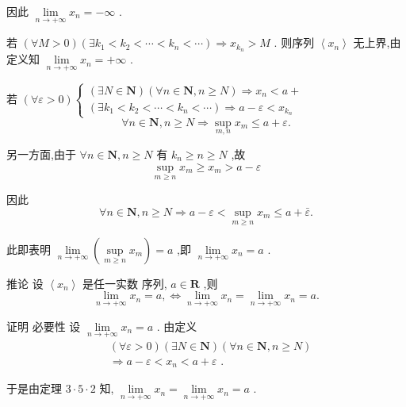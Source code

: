 因此 $\mathop{\lim }\limits_{{n \rightarrow   + \infty }}{x}_{n} =  - \infty$ .

若 $\left( {\forall M > 0}\right) \left( {\exists {k}_{1} < {k}_{2} < \cdots  < {k}_{n} < \cdots }\right)  \Rightarrow  {x}_{{k}_{n}} > M$ . 则序列 $\left\langle  {x}_{n}\right\rangle$ 无上界,由定义知 $\mathop{\lim }\limits_{{n \rightarrow   + \infty }}{x}_{n} =  + \infty$ .

若 $\left( {\forall \varepsilon  > 0}\right) \left\{  \begin{array}{l} \left( {\exists N \in  \mathbf{N}}\right) \left( {\forall n \in  \mathbf{N},n \geq  N}\right)  \Rightarrow  {x}_{n} < a + \\  \left( {\exists {k}_{1} < {k}_{2} < \cdots  < {k}_{n} < \cdots }\right)  \Rightarrow  a - \varepsilon  < {x}_{{k}_{n}} \end{array}\right.$
$$\forall n \in  \mathbf{N},n \geq  N \Rightarrow  \mathop{\sup }\limits_{{m,n}}{x}_{m} \leq  a + \varepsilon .$$

另一方面,由于 $\forall n \in  \mathbf{N},n \geq  N$ 有 ${k}_{n} \geq  n \geq  N$ ,故
$$\mathop{\sup }\limits_{{m \geq  n}}{x}_{m} \geq  {x}_{m} > a - \varepsilon$$

因此
$$\forall n \in  \mathbf{N},n \geq  N \Rightarrow  a - \varepsilon  < \mathop{\sup }\limits_{{m \geq  n}}{x}_{m} \leq  a + \bar{\varepsilon }.$$

此即表明 $\mathop{\lim }\limits_{{n \rightarrow   + \infty }}\left( {\mathop{\sup }\limits_{{m \geq  n}}{x}_{m}}\right)  = a$ ,即 $\mathop{\lim }\limits_{{n \rightarrow   + \infty }}{x}_{n} = a$ .

推论 设 $\left\langle  {x}_{n}\right\rangle$ 是任一实数 序列, $a \in  \mathbf{R}$ ,则
$$\mathop{\lim }\limits_{{n \rightarrow   + \infty }}{x}_{n} = a, \Leftrightarrow  \mathop{\lim }\limits_{{n \rightarrow   + \infty }}{x}_{n} = \mathop{\lim }\limits_{{n \rightarrow   + \infty }}{x}_{n} = a.$$

证明 必要性 设 $\mathop{\lim }\limits_{{n \rightarrow   + \infty }}{x}_{n} = a$ . 由定义
\begin{align*}
	&\left( {\forall \varepsilon  > 0}\right) \left( {\exists N \in  \mathbf{N}}\right) \left( {\forall n \in  \mathbf{N},n \geq  N}\right)\\
	&\Rightarrow  a - \varepsilon  < {x}_{n} < a + \varepsilon \text{ . }
\end{align*}

于是由定理 $3 \cdot  5 \cdot  2$ 知, $\mathop{\lim }\limits_{{n \rightarrow   + \infty }}{x}_{n} = \mathop{\lim }\limits_{{n \rightarrow   + \infty }}{x}_{n} = a$ .

